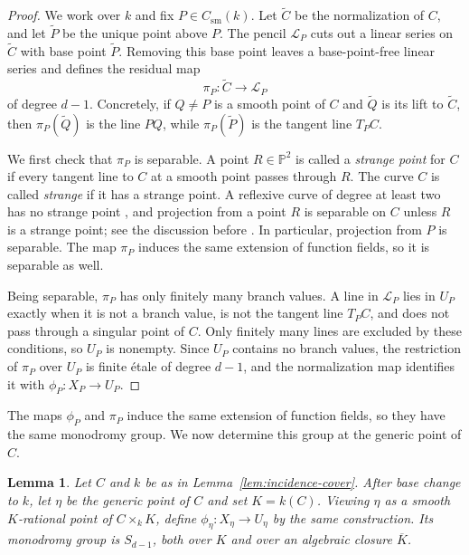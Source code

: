 \documentclass[12pt,reqno]{amsart}
\newtheorem{lemma}[theorem]{Lemma}
\theoremstyle{definition}
\theoremstyle{remark}
\newcommand{\bP}{\mathbb{P}}
\begin{document}
\begin{proof}
We work over $k$ and fix $P\in C_{\mathrm{sm}}(k)$. Let $\widetilde C$ be the normalization of $C$, and let $\widetilde P$ be the unique point above $P$. The pencil $\mathcal L_P$ cuts out a linear series on $\widetilde C$ with base point $\widetilde P$. Removing this base point leaves a base-point-free linear series and defines the residual map
\[
\pi_P\colon\widetilde C\longrightarrow\mathcal L_P
\]
of degree $d-1$. Concretely, if $Q\neq P$ is a smooth point of $C$ and $\widetilde Q$ is its lift to $\widetilde C$, then $\pi_P(\widetilde Q)$ is the line $PQ$, while $\pi_P(\widetilde P)$ is the tangent line $T_PC$.

We first check that $\pi_P$ is separable. A point $R\in\bP^2$ is called a \emph{strange point} for $C$ if every tangent line to $C$ at a smooth point passes through $R$. The curve $C$ is called \emph{strange} if it has a strange point. A reflexive curve of degree at least two has no strange point \cite[p.~4]{Hef89}, and projection from a point $R$ is separable on $C$ unless $R$ is a strange point; see the discussion before \cite[Lemma~2.2]{Ent21}. In particular, projection from $P$ is separable. The map $\pi_P$ induces the same extension of function fields, so it is separable as well.

Being separable, $\pi_P$ has only finitely many branch values. A line in $\mathcal L_P$ lies in $U_P$ exactly when it is not a branch value, is not the tangent line $T_PC$, and does not pass through a singular point of $C$. Only finitely many lines are excluded by these conditions, so $U_P$ is nonempty. Since $U_P$ contains no branch values, the restriction of $\pi_P$ over $U_P$ is finite \'etale of degree $d-1$, and the normalization map identifies it with $\phi_P\colon X_P\to U_P$.
\end{proof}

The maps $\phi_P$ and $\pi_P$ induce the same extension of
function fields, so they have the same monodromy group.
We now determine this group at the generic point of $C$.

\begin{lemma}\label{lem:generic-projection-monodromy}
Let $C$ and $k$ be as in Lemma~\ref{lem:incidence-cover}. After base change to $k$, let $\eta$ be the generic point of $C$ and set $K=k(C)$. Viewing $\eta$ as a smooth $K$-rational point of $C\times_k K$, define $\phi_\eta\colon X_\eta\to U_\eta$ by the same construction. Its monodromy group is $S_{d-1}$, both over $K$ and over an algebraic closure $\overline K$.
\end{lemma}
\end{document}
